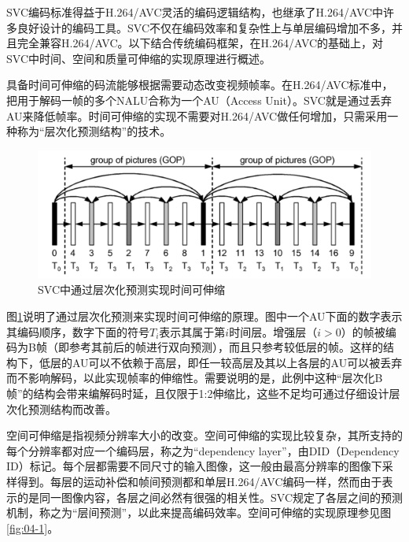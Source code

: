 SVC编码标准得益于H.264/AVC灵活的编码逻辑结构，也继承了H.264/AVC中许多良好设计的编码工具。SVC不仅在编码效率和复杂性上与单层编码增加不多\supercite{SVC-Performance}，并且完全兼容H.264/AVC。以下结合传统编码框架，在H.264/AVC的基础上，对SVC中时间、空间和质量可伸缩的实现原理进行概述。

具备时间可伸缩的码流能够根据需要动态改变视频帧率。在H.264/AVC标准中，把用于解码一帧的多个NALU合称为一个AU（Access Unit）。SVC就是通过丢弃AU来降低帧率。时间可伸缩的实现不需要对H.264/AVC做任何增加，只需采用一种称为“层次化预测结构”的技术。

\begin{figure}[h]
	\centering
	\includegraphics[width = 1.0\linewidth]{clip/04.png}
	\caption{SVC中通过层次化预测实现时间可伸缩\label{fig:04}}
\end{figure}

图\ref{fig:04}\supercite{SVC-Overview}说明了通过层次化预测来实现时间可伸缩的原理。图中一个AU下面的数字表示其编码顺序，数字下面的符号$T_i$表示其属于第$i$时间层。增强层（$i>0$）的帧被编码为B帧（即参考其前后的帧进行双向预测），而且只参考较低层的帧。这样的结构下，低层的AU可以不依赖于高层，即任一较高层及其以上各层的AU可以被丢弃而不影响解码，以此实现帧率的伸缩性。需要说明的是，此例中这种“层次化B帧”的结构会带来编解码时延，且仅限于1:2伸缩比，这些不足均可通过仔细设计层次化预测结构而改善。

空间可伸缩是指视频分辨率大小的改变。空间可伸缩的实现比较复杂，其所支持的每个分辨率都对应一个编码层，称之为“dependency layer”，由DID（Dependency ID）标记。每个层都需要不同尺寸的输入图像，这一般由最高分辨率的图像下采样得到。每层的运动补偿和帧间预测都和单层H.264/AVC编码一样，然而由于表示的是同一图像内容，各层之间必然有很强的相关性。SVC规定了各层之间的预测机制，称之为“层间预测”，以此来提高编码效率。空间可伸缩的实现原理参见图\ref{fig:04-1}\supercite{SVC-Spatial}。

